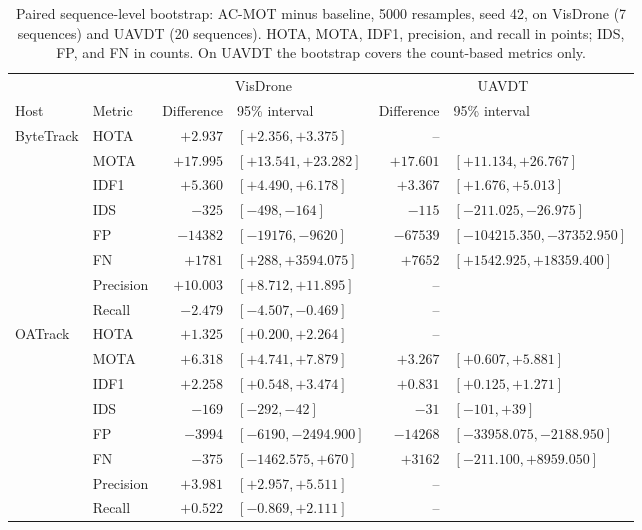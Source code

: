 \documentclass[journal]{new-aiaa}
\begin{document}
\begin{table}[htbp]
\caption{Paired sequence-level bootstrap: AC-MOT minus baseline, 5000
resamples, seed 42, on VisDrone (7 sequences) and UAVDT (20 sequences). HOTA,
MOTA, IDF1, precision, and recall in points; IDS, FP, and FN in counts. On
UAVDT the bootstrap covers the count-based metrics only.}
\label{tab:bootstrap}
\centering\footnotesize
\setlength{\tabcolsep}{3pt}
\begin{tabular}{@{}llrlrl@{}}
\toprule
 & & \multicolumn{2}{c}{VisDrone} & \multicolumn{2}{c}{UAVDT}\\
\cmidrule(lr){3-4}\cmidrule(l){5-6}
Host & Metric & Difference & 95\% interval & Difference & 95\% interval\\
\midrule
ByteTrack & HOTA & $+2.937$ & $[+2.356, +3.375]$ & -- & \\
 & MOTA & $+17.995$ & $[+13.541, +23.282]$ & $+17.601$ & $[+11.134, +26.767]$\\
 & IDF1 & $+5.360$ & $[+4.490, +6.178]$ & $+3.367$ & $[+1.676, +5.013]$\\
 & IDS & $-325$ & $[-498, -164]$ & $-115$ & $[-211.025, -26.975]$\\
 & FP & $-14382$ & $[-19176, -9620]$ & $-67539$ & $[-104215.350, -37352.950]$\\
 & FN & $+1781$ & $[+288, +3594.075]$ & $+7652$ & $[+1542.925, +18359.400]$\\
 & Precision & $+10.003$ & $[+8.712, +11.895]$ & -- & \\
 & Recall & $-2.479$ & $[-4.507, -0.469]$ & -- & \\
\midrule
OATrack & HOTA & $+1.325$ & $[+0.200, +2.264]$ & -- & \\
 & MOTA & $+6.318$ & $[+4.741, +7.879]$ & $+3.267$ & $[+0.607, +5.881]$\\
 & IDF1 & $+2.258$ & $[+0.548, +3.474]$ & $+0.831$ & $[+0.125, +1.271]$\\
 & IDS & $-169$ & $[-292, -42]$ & $-31$ & $[-101, +39]$\\
 & FP & $-3994$ & $[-6190, -2494.900]$ & $-14268$ & $[-33958.075, -2188.950]$\\
 & FN & $-375$ & $[-1462.575, +670]$ & $+3162$ & $[-211.100, +8959.050]$\\
 & Precision & $+3.981$ & $[+2.957, +5.511]$ & -- & \\
 & Recall & $+0.522$ & $[-0.869, +2.111]$ & -- & \\
\bottomrule
\end{tabular}
\end{table}
\end{document}
